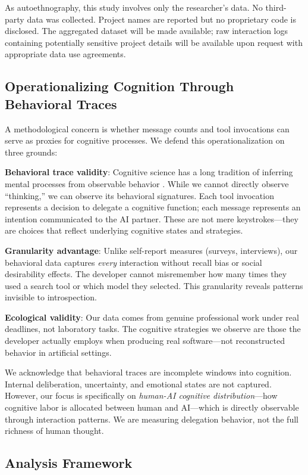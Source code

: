\documentclass{ntlabs-preprint}
\begin{document}
As autoethnography, this study involves only the researcher's data. No third-party data was collected. Project names are reported but no proprietary code is disclosed. The aggregated dataset will be made available; raw interaction logs containing potentially sensitive project details will be available upon request with appropriate data use agreements.

\subsection{Operationalizing Cognition Through Behavioral Traces}

A methodological concern is whether message counts and tool invocations can serve as proxies for cognitive processes. We defend this operationalization on three grounds:

\textbf{Behavioral trace validity}: Cognitive science has a long tradition of inferring mental processes from observable behavior \citep{letovsky1987cognitive}. While we cannot directly observe ``thinking,'' we can observe its behavioral signatures. Each tool invocation represents a decision to delegate a cognitive function; each message represents an intention communicated to the AI partner. These are not mere keystrokes---they are choices that reflect underlying cognitive states and strategies.

\textbf{Granularity advantage}: Unlike self-report measures (surveys, interviews), our behavioral data captures \textit{every} interaction without recall bias or social desirability effects. The developer cannot misremember how many times they used a search tool or which model they selected. This granularity reveals patterns invisible to introspection.

\textbf{Ecological validity}: Our data comes from genuine professional work under real deadlines, not laboratory tasks. The cognitive strategies we observe are those the developer actually employs when producing real software---not reconstructed behavior in artificial settings.

We acknowledge that behavioral traces are incomplete windows into cognition. Internal deliberation, uncertainty, and emotional states are not captured. However, our focus is specifically on \textit{human-AI cognitive distribution}---how cognitive labor is allocated between human and AI---which is directly observable through interaction patterns. We are measuring delegation behavior, not the full richness of human thought.

\subsection{Analysis Framework}
\end{document}
